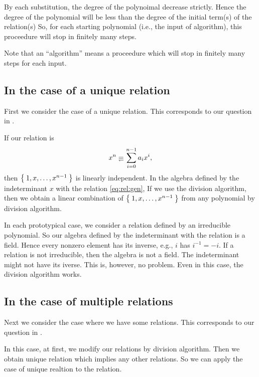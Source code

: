 \begin{remark}
  By each substitution,
  the degree of the polynoimal
  decrease strictly.
  Hence the degree of the polynomial
  will be less than the degree of the initial term(s) of the relation(s)
  So,
  for each starting polynomial
  (i.e., the  input of algorithm),
  this proceedure will stop
  in finitely many steps.

  Note that an ``algorithm'' means
  a proceedure which will stop in finitely many steps
  for each input.
\end{remark}

\subsection{In the case of a unique relation}

First we consider the case of a unique relation.
This corresponds to our question  in .

If our relation is
\begin{align}
  x^n\denotes \sum_{i=0}^{n-1}a_ix^i,
  \label{eq:rel:gen}
\end{align}
then $\Set{1,x,\ldots,x^{n-1}}$ is linearly independent.
In the algebra defined by the indeterminant $x$ with the relation \ref{eq:rel:gen},
If we use the division algorithm,
then we obtain a linear combination of $\Set{1,x,\ldots,x^{n-1}}$
from any polynomial by division algorithm.


\begin{remark}
  In each prototypical case,
  we consider a relation defined by an irreducible polynomial.
  So our algebra defined by the indeterminant with the relation
  is a field.
  Hence every nonzero element has its inverse,
  e.g., $i$ has $i^{-1}=-i$.
  If a  relation is not irreducible,
  then the algebra is not a field.
  The  indeterminant might not have its iverse.
  This is, however, no problem.
  Even in this case,
  the division algorithm works.
\end{remark}


\subsection{In the case of multiple relations}

Next we consider the case where we have some relations.
This corresponds to our question  in .

In this case,
at first, we modify our relations by division algorithm.
Then we obtain unique relation which
implies any other relations.
So we can apply the case of unique realtion to the relation.

